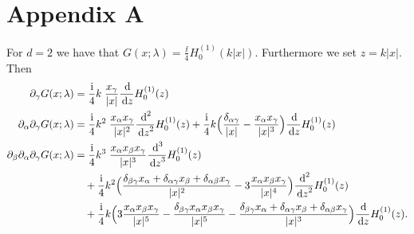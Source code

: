 \chapter*{Appendix A}

For $d = 2$ we have that $G(x; \lambda) = \frac{\ii}{4} H_0^{(1)}(k|x|)$.
Furthermore we set $z =  k|x|$.  
Then
\begin{align*}
  \partial_\gamma G(x; \lambda) &= \frac{\ii}{4} k\;  \frac{x_\gamma}{|x|} \frac{\d{}}{\d z} H_0^{(1)}(z) \\
  \partial_\alpha \partial_\gamma G(x; \lambda) 
  &= \frac{\ii}{4} k^2 \;  \frac{x_\alpha x_\gamma}{|x|^2} \frac{\d{}^2}{\d z^2} H_0^{(1)}(z) + \frac{\ii}{4} k \Big(\frac{\delta_{\alpha\gamma}}{|x|} - \frac{x_\alpha x_\gamma}{|x|^3} \Big) \frac{\d{}}{\d z} H_0^{(1)}(z) \\
  \partial_\beta \partial_\alpha \partial_\gamma G(x; \lambda)
  &= \frac{\ii}{4} k^3 \; \frac{x_\alpha x_\beta x_\gamma}{|x|^3} \frac{\d{}^3}{\d z^3} H_0^{(1)}(z) \\
  &\quad + \frac{\ii}{4} k^2 \Big(\frac{\delta_{\beta\gamma} x_\alpha + \delta_{\alpha \gamma} x_\beta + \delta_{\alpha \beta} x_\gamma}{|x|^2} - 3 \frac{x_\alpha x_\beta x_\gamma}{|x|^4} \Big) \frac{\d{}^2}{\d z^2} H_0^{(1)}(z) \\
  &\quad + \frac{\ii}{4} k \Big( 3 \frac{x_\alpha x_\beta x_\gamma}{|x|^5} - \frac{\delta_{\beta\gamma} x_\alpha x_\beta x_\gamma}{|x|^5} - \frac{\delta_{\beta\gamma} x_\alpha + \delta_{\alpha\gamma} x_\beta + \delta_{\alpha\beta} x_\gamma}{|x|^3} \Big) \frac{\d{}}{\d z} H_0^{(1)}(z).
\end{align*}

